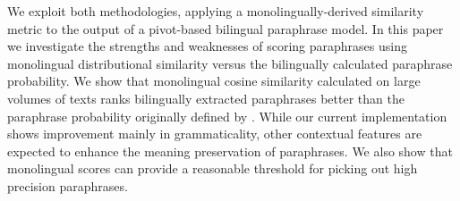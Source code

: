 \documentclass[11pt]{article}
\begin{document}


We exploit both methodologies, applying a monolingually-derived similarity metric to the output of a pivot-based bilingual paraphrase model.  
In this paper we investigate the strengths and weaknesses of scoring paraphrases using monolingual distributional similarity versus the bilingually calculated paraphrase probability.  We show that monolingual cosine similarity calculated on large volumes of texts ranks bilingually extracted paraphrases better than the paraphrase probability originally defined by . While our current implementation shows improvement mainly in grammaticality, other contextual features are expected to enhance the meaning preservation of paraphrases. We also show that monolingual scores can provide a reasonable threshold for picking out high precision paraphrases. 

\end{document}
